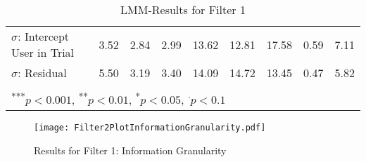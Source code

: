{\begin{landscape}
\begin{table}
\begin{center}
\begin{tabular}{l D{.}{.}{5.5} @{}D{.}{.}{5.5} @{}D{.}{.}{5.5} @{}D{.}{.}{5.5} @{}D{.}{.}{5.5} @{}D{.}{.}{5.5} @{}D{.}{.}{4.5}@{}D{.}{.}{4.5} @{}}
$\sigma$: Intercept User in Trial &   3.52     &     2.84    &      2.99 &13.62&  12.81     &    17.58   &   0.59  & 7.11 \\
$\sigma$: Residual         &     5.50   &    3.19   &    3.40    &       14.09&   14.72    &    13.45   & 0.47& 5.82\\
\bottomrule
\vspace{-3mm}\\
\end{tabular}
\caption{LMM-Results for Filter 1}
\label{table:coefficients}
\end{center}
\end{table}
\end{landscape}} 
\begin{figure}[H] %
\begin{center}
\texttt{[image: Filter2PlotInformationGranularity.pdf]}    
  \caption[Results for Filter 1: Information Granularity]{Results for Filter 1: Information Granularity\footnotemark}
    \label{fig:Results for Filter 1: Information Granularity} 
\end{center}
\end{figure}


